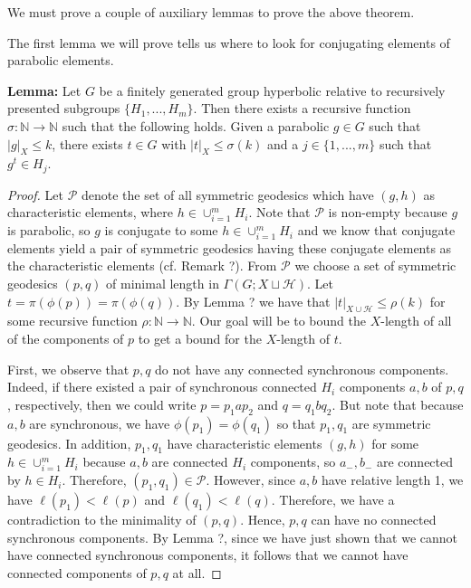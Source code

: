 \documentclass[12pt]{article}
\newcommand{\vs}{\vskip10pt}
\begin{document}
	We must prove a couple of auxiliary lemmas to prove the above theorem.
	
	\vs 
	
	The first lemma we will prove tells us where to look for conjugating elements of parabolic elements. 
	
	\vs 
	
	\textbf{Lemma: } Let $G$ be a finitely generated group hyperbolic relative to recursively presented subgroups $\{H_1,...,H_m\}$. Then there exists a recursive function $\sigma: \mathbb{N} \rightarrow \mathbb{N}$ such that the following holds. Given a parabolic $g \in G$ such that $\vert g \vert_X \leq k$, there exists $t \in G$ with $\vert t \vert_X \leq \sigma(k)$ and a $j \in \{1,...,m\}$ such that $g^t \in H_j$.
	
	\begin{proof}
		
		Let $\mathcal{P}$ denote the set of all symmetric geodesics which have $(g,h)$ as characteristic elements, where $h \in \cup_{i=1}^m H_i$. Note that $\mathcal{P}$ is non-empty because $g$ is parabolic, so $g$ is conjugate to some $h \in \cup_{i=1}^m H_i$ and we know that conjugate elements yield a pair of symmetric geodesics having these conjugate elements as the characteristic elements (cf. Remark ?). From $\mathcal{P}$ we choose a set of symmetric geodesics $(p,q)$ of minimal length in $\Gamma(G; X \sqcup \mathcal{H})$. Let $t = \pi(\phi(p)) = \pi(\phi(q))$. By Lemma ? we have that $\vert t \vert_{X \cup \mathcal{H}} \leq \rho(k)$ for some recursive function $\rho: \mathbb{N} \rightarrow \mathbb{N}$. Our goal will be to bound the $X$-length of all of the components of $p$ to get a bound for the $X$-length of $t$. 
		
		\vs 
		
		First, we observe that $p,q$ do not have any connected synchronous components. Indeed, if there existed a pair of synchronous connected $H_i$ components $a,b$ of $p,q$, respectively, then we could write $p = p_1 a p_2$ and $q = q_1 b q_2$. But note that because $a,b$ are synchronous, we have $\phi(p_1) = \phi(q_1)$ so that $p_1, q_1$ are symmetric geodesics. In addition, $p_1, q_1$ have characteristic elements $(g,h)$ for some $h \in \cup_{i=1}^m H_i$ because $a,b$ are connected $H_i$ components, so $a_{-}, b_{-}$ are connected by $h \in H_i$. Therefore, $(p_1,q_1) \in \mathcal{P}$. However, since $a,b$ have relative length 1, we have $\ell(p_1) < \ell(p)$ and $\ell(q_1) < \ell(q)$. Therefore, we have a contradiction to the minimality of $(p,q)$. Hence, $p,q$ can have no connected synchronous components. By Lemma ?, since we have just shown that we cannot have connected synchronous components, it follows that we cannot have connected components of $p,q$ at all. 
		

\end{proof}
\end{document}
